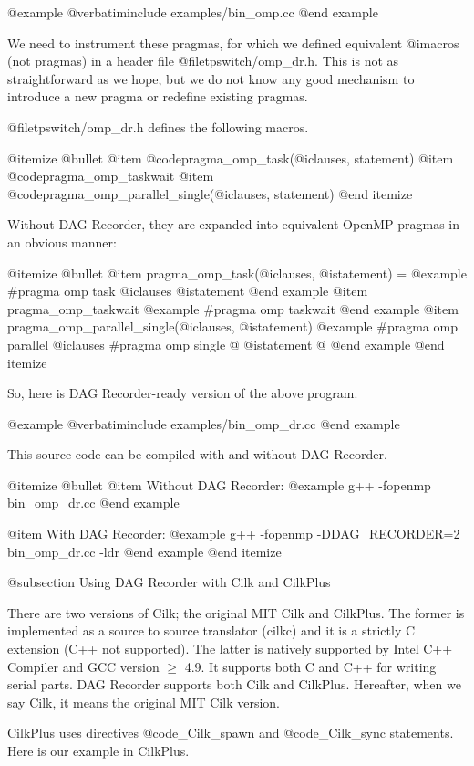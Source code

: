 @example
@verbatiminclude examples/bin_omp.cc
@end example

We need to instrument these pragmas, for which we defined equivalent
@i{macros} (not pragmas) in a header file @file{tpswitch/omp_dr.h}.
This is not as straightforward as we hope, but we do not know any good
mechanism to introduce a new pragma or redefine existing pragmas.

@file{tpswitch/omp_dr.h} defines the following macros.

@itemize @bullet
@item @code{pragma_omp_task(@i{clauses, statement})}
@item @code{pragma_omp_taskwait}
@item @code{pragma_omp_parallel_single(@i{clauses, statement})}
@end itemize

Without DAG Recorder, they are expanded into equivalent OpenMP pragmas
in an obvious manner:

@itemize @bullet
@item pragma_omp_task(@i{clauses}, @i{statement}) =
@example
#pragma omp task @i{clauses}
  @i{statement}
@end example
@item pragma_omp_taskwait 
@example
#pragma omp taskwait
@end example
@item pragma_omp_parallel_single(@i{clauses}, @i{statement})
@example
#pragma omp parallel @i{clauses}
#pragma omp single
@{
  @i{statement}
@}
@end example
@end itemize

So, here is DAG Recorder-ready version of the above program.

@example
@verbatiminclude examples/bin_omp_dr.cc
@end example

This source code can be compiled with and without DAG Recorder.

@itemize @bullet
@item Without DAG Recorder:
@example
g++ -fopenmp bin_omp_dr.cc 
@end example

@item With DAG Recorder:
@example
g++ -fopenmp -DDAG_RECORDER=2 bin_omp_dr.cc -ldr
@end example
@end itemize

@subsection Using DAG Recorder with Cilk and CilkPlus

There are two versions of Cilk; the original MIT Cilk and CilkPlus.
The former is implemented as a source to source translator (cilkc) and it is a strictly C extension (C++ not supported).
The latter is natively supported by Intel C++ Compiler and GCC version $\geq$ 4.9.  
It supports both C and C++ for writing serial parts.
DAG Recorder supports both Cilk and CilkPlus.
Hereafter, when we say Cilk, it means the original MIT Cilk version.

CilkPlus uses directives @code{_Cilk_spawn} and @code{_Cilk_sync} statements.
Here is our example in CilkPlus.

